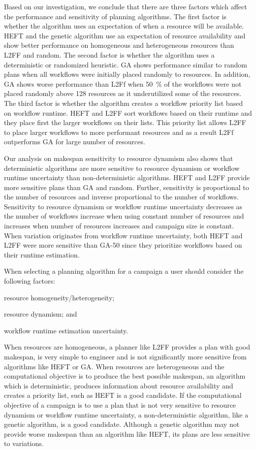 Based on our investigation, we conclude that there are three factors which affect the performance and sensitivity of planning algorithms.
The first factor is whether the algorithm uses an expectation of when a resource will be available.
HEFT and the genetic algorithm use an expectation of resource availability and show better performance on homogeneous and heterogeneous resources than L2FF and random.
The second factor is whether the algorithm uses a deterministic or randomized heuristic.
GA shows performance similar to random plans when all workflows were initially placed randomly to resources.
In addition, GA shows worse performance than L2Ff when 50~\% of the workflows were not placed randomly above 128 resources as it underutilized some of the resources.
The third factor is whether the algorithm creates a workflow priority list based on workflow runtime.
HEFT and L2FF sort workflows based on their runtime and they place first the larger workflows on their lists.
This priority list allows L2FF to place larger workflows to more performant resources and as a result L2Ff outperforms GA for large number of resources.

Our analysis on makespan sensitivity to resource dynamism also shows that deterministic algorithms are more sensitive to resource dynamism or workflow runtime uncertainty than non-deterministic algorithms.
HEFT and L2FF provide more sensitive plans than GA and random.
Further, sensitivity is proportional to the number of resources and inverse proportional to the number of workflows.
Sensitivity to resource dynamism or workflow runtime uncertainty decreases as the number of workflows increase when using constant number of resources and increases when number of resources increases and campaign size is constant.
When variation originates from workflow runtime uncertainty, both HEFT and L2FF were more sensitive than GA-50 since they prioritize workflows based on their runtime estimation.

When selecting a planning algorithm for a campaign a user should consider the following factors:
\begin{inparaenum}[1)]
    \item resource homogeneity/heterogeneity;
    \item resource dynamism; and
    \item workflow runtime estimation uncertainty.
\end{inparaenum}
When resources are homogeneous, a planner like L2FF provides a plan with good makespan, is very simple to engineer and is not significantly more sensitive from algorithms like HEFT or GA.
When resources are heterogeneous and the computational objective is to produce the best possible makespan, an algorithm which is deterministic, produces information about resource availability and creates a priority list, such as HEFT is a good candidate.
If the computational objective of a campaign is to use a plan that is not very sensitive to resource dynamism or workflow runtime uncertainty, a non-deterministic algorithm, like a genetic algorithm, is a good candidate.
Although a genetic algorithm may not provide worse makespan than an algorithm like HEFT, its plans are less sensitive to variations.


